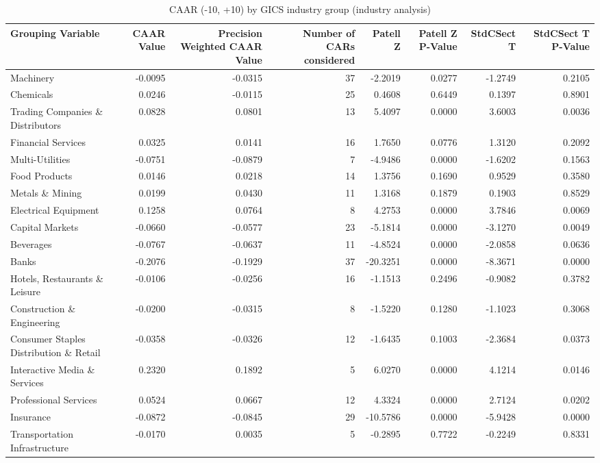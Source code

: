 \begin{table}
\caption{CAAR (-10, +10) by GICS industry group (industry analysis)}
\label{tab:industry_caar}
\begin{tabular}{lrrrrrrr}
\toprule
Grouping Variable & CAAR Value & Precision Weighted CAAR Value & Number of CARs considered & Patell Z & Patell Z P-Value & StdCSect T & StdCSect T P-Value \\
\midrule
Machinery & -0.0095 & -0.0315 & 37 & -2.2019 & 0.0277 & -1.2749 & 0.2105 \\
Chemicals & 0.0246 & -0.0115 & 25 & 0.4608 & 0.6449 & 0.1397 & 0.8901 \\
Trading Companies \& Distributors & 0.0828 & 0.0801 & 13 & 5.4097 & 0.0000 & 3.6003 & 0.0036 \\
Financial Services & 0.0325 & 0.0141 & 16 & 1.7650 & 0.0776 & 1.3120 & 0.2092 \\
Multi-Utilities & -0.0751 & -0.0879 & 7 & -4.9486 & 0.0000 & -1.6202 & 0.1563 \\
Food Products & 0.0146 & 0.0218 & 14 & 1.3756 & 0.1690 & 0.9529 & 0.3580 \\
Metals \& Mining & 0.0199 & 0.0430 & 11 & 1.3168 & 0.1879 & 0.1903 & 0.8529 \\
Electrical Equipment & 0.1258 & 0.0764 & 8 & 4.2753 & 0.0000 & 3.7846 & 0.0069 \\
Capital Markets & -0.0660 & -0.0577 & 23 & -5.1814 & 0.0000 & -3.1270 & 0.0049 \\
Beverages & -0.0767 & -0.0637 & 11 & -4.8524 & 0.0000 & -2.0858 & 0.0636 \\
Banks & -0.2076 & -0.1929 & 37 & -20.3251 & 0.0000 & -8.3671 & 0.0000 \\
Hotels, Restaurants \& Leisure & -0.0106 & -0.0256 & 16 & -1.1513 & 0.2496 & -0.9082 & 0.3782 \\
Construction \& Engineering & -0.0200 & -0.0315 & 8 & -1.5220 & 0.1280 & -1.1023 & 0.3068 \\
Consumer Staples Distribution \& Retail & -0.0358 & -0.0326 & 12 & -1.6435 & 0.1003 & -2.3684 & 0.0373 \\
Interactive Media \& Services & 0.2320 & 0.1892 & 5 & 6.0270 & 0.0000 & 4.1214 & 0.0146 \\
Professional Services & 0.0524 & 0.0667 & 12 & 4.3324 & 0.0000 & 2.7124 & 0.0202 \\
Insurance & -0.0872 & -0.0845 & 29 & -10.5786 & 0.0000 & -5.9428 & 0.0000 \\
Transportation Infrastructure & -0.0170 & 0.0035 & 5 & -0.2895 & 0.7722 & -0.2249 & 0.8331 \\

\end{tabular}
\end{table}
